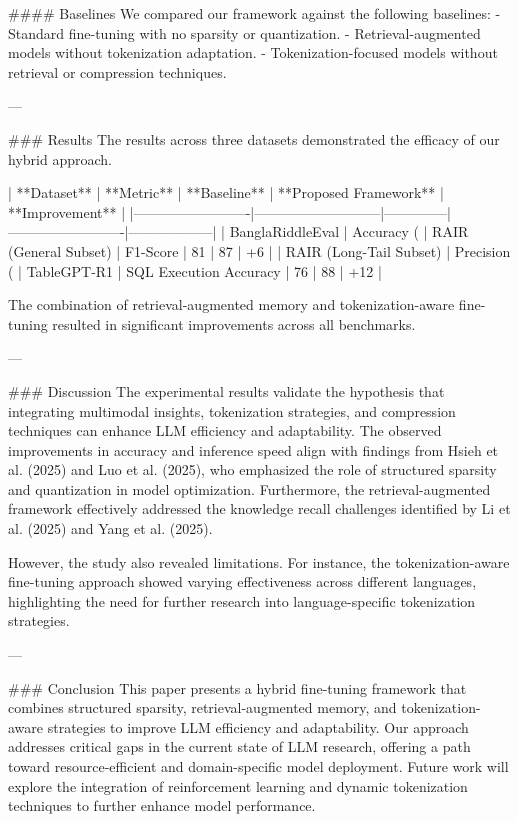 #### Baselines  
We compared our framework against the following baselines:  
- Standard fine-tuning with no sparsity or quantization.  
- Retrieval-augmented models without tokenization adaptation.  
- Tokenization-focused models without retrieval or compression techniques.

---

### Results  
The results across three datasets demonstrated the efficacy of our hybrid approach.  

| **Dataset**            | **Metric**                | **Baseline** | **Proposed Framework** | **Improvement** |
|-------------------------|---------------------------|--------------|-------------------------|------------------|
| BanglaRiddleEval        | Accuracy (%
| RAIR (General Subset)   | F1-Score                 | 81           | 87                      | +6              |
| RAIR (Long-Tail Subset) | Precision (%
| TableGPT-R1             | SQL Execution Accuracy   | 76           | 88                      | +12             |

The combination of retrieval-augmented memory and tokenization-aware fine-tuning resulted in significant improvements across all benchmarks.

---

### Discussion  
The experimental results validate the hypothesis that integrating multimodal insights, tokenization strategies, and compression techniques can enhance LLM efficiency and adaptability. The observed improvements in accuracy and inference speed align with findings from Hsieh et al. (2025) and Luo et al. (2025), who emphasized the role of structured sparsity and quantization in model optimization. Furthermore, the retrieval-augmented framework effectively addressed the knowledge recall challenges identified by Li et al. (2025) and Yang et al. (2025).

However, the study also revealed limitations. For instance, the tokenization-aware fine-tuning approach showed varying effectiveness across different languages, highlighting the need for further research into language-specific tokenization strategies.

---

### Conclusion  
This paper presents a hybrid fine-tuning framework that combines structured sparsity, retrieval-augmented memory, and tokenization-aware strategies to improve LLM efficiency and adaptability. Our approach addresses critical gaps in the current state of LLM research, offering a path toward resource-efficient and domain-specific model deployment. Future work will explore the integration of reinforcement learning and dynamic tokenization techniques to further enhance model performance.

